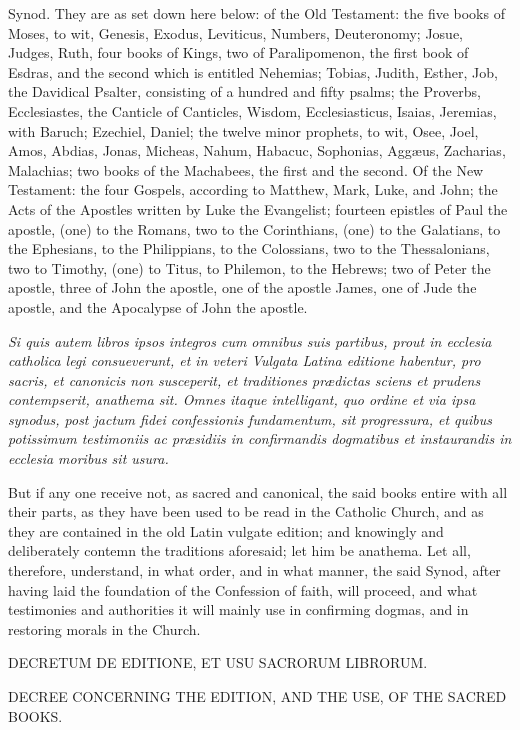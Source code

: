 Synod. They are as set down here below: of the Old Testament: the five books of Moses, to wit, Genesis, Exodus, Leviticus, Numbers, Deuteronomy; Josue, Judges, Ruth, four books of Kings, two of Paralipomenon, the first book of Esdras, and the second which is entitled Nehemias; Tobias, Judith, Esther, Job, the Davidical Psalter, consisting of a hundred and fifty psalms; the Proverbs, Ecclesiastes, the Canticle of Canticles, Wisdom, Ecclesiasticus, Isaias, Jeremias, with Baruch; Ezechiel, Daniel; the twelve minor prophets, to wit, Osee, Joel, Amos, Abdias, Jonas, Micheas, Nahum, Habacuc, Sophonias, Aggæus, Zacharias, Malachias; two books of the Machabees, the first and the second. Of the New Testament: the four Gospels, according to Matthew, Mark, Luke, and John; the Acts of the Apostles written by Luke the Evangelist; fourteen epistles of Paul the apostle, (one) to the Romans, two to the Corinthians, (one) to the Galatians, to the Ephesians, to the Philippians, to the Colossians, two to the Thessalonians, two to Timothy, (one) to Titus, to Philemon, to the Hebrews; two of Peter the apostle, three of John the apostle, one of the apostle James, one of Jude the apostle, and the Apocalypse of John the apostle.

\emph{Si quis autem libros ipsos integros cum omnibus suis partibus, prout in ecclesia catholica legi consueverunt, et in veteri Vulgata Latina editione habentur, pro sacris, et canonicis non susceperit, et traditiones prædictas sciens et prudens contempserit, anathema sit. Omnes itaque intelligant, quo ordine et via ipsa synodus, post jactum fidei confessionis fundamentum, sit progressura, et quibus potissimum testimoniis ac præsidiis in confirmandis dogmatibus et instaurandis in ecclesia moribus sit usura.}

But if any one receive not, as sacred and canonical, the said books entire with all their parts, as they have been used to be read in the Catholic Church, and as they are contained in the old Latin vulgate edition; and knowingly and deliberately contemn the traditions aforesaid; let him be anathema. Let all, therefore, understand, in what order, and in what manner, the said Synod, after having laid the foundation of the Confession of faith, will proceed, and what testimonies and authorities it will mainly use in confirming dogmas, and in restoring morals in the Church.

DECRETUM DE EDITIONE, ET USU SACRORUM LIBRORUM.

DECREE CONCERNING THE EDITION, AND THE USE, OF THE SACRED BOOKS.


